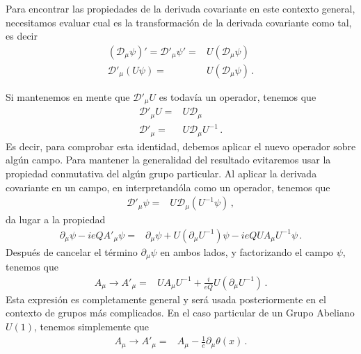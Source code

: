 \begin{frame}
Para encontrar las propiedades de la derivada covariante en este contexto general, necesitamos evaluar cual es la transformación de la derivada covariante como tal, es decir
\begin{align}
 \left(\mathcal{D}_\mu \psi\right)'=     \mathcal{D}'_\mu \psi'=&U\left(\mathcal{D}_\mu \psi\right)\nonumber\\
    \mathcal{D}'_\mu \left( U\psi \right)=&U\left(\mathcal{D}_\mu \psi\right)\,.
\end{align}

Si mantenemos en mente que  $\mathcal{D}'_\mu U$ es todavía un operador, tenemos que
\begin{align}
    \mathcal{D}'_\mu U=&U\mathcal{D}_\mu \nonumber\\
    \mathcal{D}'_\mu =&U\mathcal{D}_\mu U^{-1} \,.
\end{align}
Es decir, para comprobar esta identidad, debemos aplicar el nuevo operador sobre algún campo. Para mantener la generalidad del resultado evitaremos usar la propiedad conmutativa del algún grupo particular. Al aplicar la derivada covariante en un campo, en interpretandóla como un operador, tenemos que
\begin{align*}
    \mathcal{D}'_\mu \psi =&U\mathcal{D}_\mu \left(U^{-1}\psi  \right)\,,
\end{align*}
da lugar a la propiedad
\begin{align}
    \partial_{\mu}\psi-ieQ A'_{\mu} \psi =&\partial_{\mu}\psi+U\left( \partial_{\mu}U^{-1} \right)\psi-ieQ  U A_{\mu}U^{-1}\psi\,.
\end{align}
Después de cancelar el término  $\partial_{\mu}\psi$ en ambos lados, y factorizando el campo  $\psi$, tenemos que
\begin{align}
       A_{\mu}\to A'_{\mu} =&U A_{\mu}U^{-1}+\frac{i}{eQ}U\left( \partial_{\mu}U^{-1} \right)\,.
\end{align}
Esta expresión es completamente general y será usada posteriormente en el contexto de grupos más complicados. En el caso particular de un Grupo Abeliano  $U(1)$, tenemos simplemente que
\begin{align}
  A_{\mu}\to  A'_{\mu}=&A_{\mu}-\frac{1}{e}\partial_{\mu}\theta(x)\,.
\end{align}


\end{frame}
